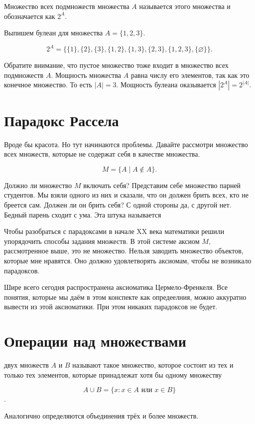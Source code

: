 \documentclass[12pt, a4paper]{article}
\begin{document}
\begin{mydef}
Множество всех подмножеств множества $A$ называется  этого множества и обозначается как $2^{A}.$
\end{mydef}

\begin{myex} 
Выпишем булеан для множества $A = \{1,2,3\}.$

\[
2^A = \{\{1\},\{2\},\{3\},\{1,2\},\{1,3\},\{2,3\},\{1,2,3\},\{\varnothing\}\}.
\]
\end{myex} 

Обратите внимание, что пустое множество тоже входит в множество всех подмножеств $A.$ Мощность множества $A$ равна числу его элементов, так как это конечное множество. То есть $|A| = 3.$ Мощность булеана оказывается $|2^A| = 2^{|A|}.$ 

\section{Парадокс Рассела}

Вроде бы красота.  Но тут начинаются проблемы. Давайте рассмотри множество всех множеств, которые не содержат себя в качестве множества. 

\[
M = \{A \mid A \notin A\}.
\]

Должно ли множество $M$ включать себя? Представим себе множество парней студентов. Мы взяли одного из них и сказали, что он должен брить всех, кто не бреется сам. Должен ли он брить себя? С одной стороны да, с другой нет. Бедный парень сходит с ума. Эта штука называется  

Чтобы разобраться с парадоксами в начале XX века математики решили упорядочить способы задания множеств. В этой системе аксиом $M,$ рассмотренное выше, это не множество. Нельзя заводить множество объектов, которые мне нравятся. Оно должно удовлетворять аксиомам, чтобы не возникало парадоксов. 

Шире всего сегодня распространена аксиоматика Цермело-Френкеля. Все понятия, которые мы даём в этом конспекте как опредеелния, можно аккуратно вывести из этой аксиоматики. При этом никаких парадоксов не будет.

\section{Операции над множествами}

\begin{mydef} 
     двух множеств $A$ и $B$ называют такое множество, которое состоит из тех и только тех элементов, которые принадлежат хотя бы одному множеству
    
    \[A \cup B = \{x: x \in A \text{ или } x \in B\}\].
    
    Аналогично определяются объединения трёх и более множеств.
\end{mydef} 
\end{document}
